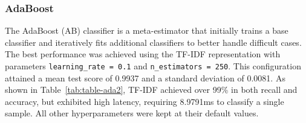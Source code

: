 \documentclass[conference]{IEEEtran}
\begin{document}
\begin{table}[H]
\caption{\label{tab:table-rf} Metrics for the Random Forrest Classifier.}

\end{table}
\vspace{-1.5ex}
\begin{table}[H]
\caption{\label{tab:table-rf2} Performance Metrics for the Random Forrest Classifier.}
\end{table}

\subsubsection{AdaBoost}
The AdaBoost (AB) classifier is a meta-estimator that initially trains a base classifier and iteratively fits additional classifiers to better handle difficult cases. The best performance was achieved using the TF-IDF representation with parameters \texttt{learning\_rate = 0.1} and \texttt{n\_estimators = 250}. This configuration attained a mean test score of 0.9937 and a standard deviation of 0.0081. As shown in Table~\ref{tab:table-ada2}, TF-IDF achieved over 99\% in both recall and accuracy, but exhibited high latency, requiring 8.9791ms to classify a single sample. All other hyperparameters were kept at their default values.


\begin{table}[H]
\caption{\label{tab:table-ada} Metrics for the AdaBoost Classifier.}
\end{table}
\end{document}
